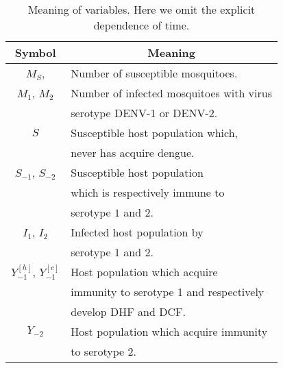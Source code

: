 \begin{table*}[htb]
	\begin{center}
		\begin{tabular}{cl}
			\toprule
			Symbol		&	\multicolumn{1}{c}{Meaning}
			\\
			\midrule
			$M_S$,
				& Number of susceptible mosquitoes.
			\\
			$M_1$, $M_2$
				&
				 Number of infected mosquitoes with virus
				\\
				& 
				serotype \ac{DENV-1} or \ac{DENV-2}.
			\\
			$S$
				&
				Susceptible host population which, 
				\\
				& never has acquire dengue.
			\\
			$S_{-1}$, $S_{-2}$
			&
				Susceptible host population 
			\\
			& which is respectively immune to
			\\
			&
				serotype $1$ and $2$.
			\\
			$I_1$, $I_2$
			&
				Infected host population by 
			\\
				& serotype $1$ and $2$.
			\\
				$Y_{-1}^{[h]}$,
				$Y_{-1}^{[c]}$
				&
				Host population which acquire
				\\
				&
				immunity to serotype 1 and respectively 
				\\
				&
				develop \ac{DHF} and \ac{DCF}.
			\\
				$Y_{-2}$
				&
				Host population which acquire immunity
				\\
				&
				to serotype 2.
			\\
		\bottomrule
		\end{tabular}
	\end{center}
	\caption{
		Meaning of variables. 
		Here we omit the explicit dependence of
		time.
	}
\end{table*}
